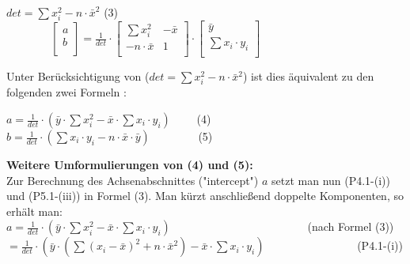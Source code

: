 \documentclass[12pt]{article}
\begin{document}
\begin{center}
\begin{large}
$ det = \sum{x_i^2} - n \cdot \bar{x}^2 $    (3) \\[0.5cm]        
$ \qquad\qquad  \begin{bmatrix} a \\ b \\ \end{bmatrix} = \frac{1}{det} \cdot { \begin{bmatrix} \sum{x_i^2} & -\bar{x} \\ -n \cdot \bar{x} & 1 \\ \end{bmatrix} \cdot                                                                                                     \begin{bmatrix} \bar{y} \\ \sum{x_i \cdot y_i} \\ \end{bmatrix}} $ \\[0.8cm]
\end{large}
\end{center} 
Unter Berücksichtigung von ($ det = \sum{x_i^2} - n \cdot \bar{x}^2 $) ist dies äquivalent zu den folgenden zwei Formeln : \\
\begin{center}
\begin{Large}
$ a = \frac{1}{det} \cdot (\bar{y} \cdot \sum{x_i^2} - \bar{x} \cdot \sum{x_i \cdot y_i})\qquad $ (4) \\[0.5cm]
$ b = \frac{1}{det} \cdot (\sum {x_i \cdot y_i} - n \cdot \bar{x} \cdot \bar{y})\qquad\qquad $      (5) \\[0.5cm]
\end{Large}
\end{center} 
\textbf{Weitere Umformulierungen von (4) und (5):}\\[0.1cm]
%
Zur Berechnung des Achsenabschnittes ("intercept") $a$ setzt man nun (P4.1-(i)) und (P5.1-(iii)) in Formel (3). Man kürzt anschließend doppelte Komponenten, so erhält  man: \\[0.2cm]
$ a = \frac{1}{det} \cdot (\bar{y} \cdot \sum{x_i^2} - \bar{x} \cdot \sum{x_i \cdot y_i})\qquad \qquad \qquad \qquad \qquad \qquad $      (nach Formel (3))
\\[0.2cm]
$ = \frac{1}{det} \cdot (\bar{y} \cdot (\sum{(x_i - \bar{x})^2} + n \cdot \bar{x}^2) - \bar{x} \cdot \sum{x_i \cdot y_i})\qquad \qquad \qquad \qquad $ (P4.1-(i)) \\[0.2cm]
\end{document}
